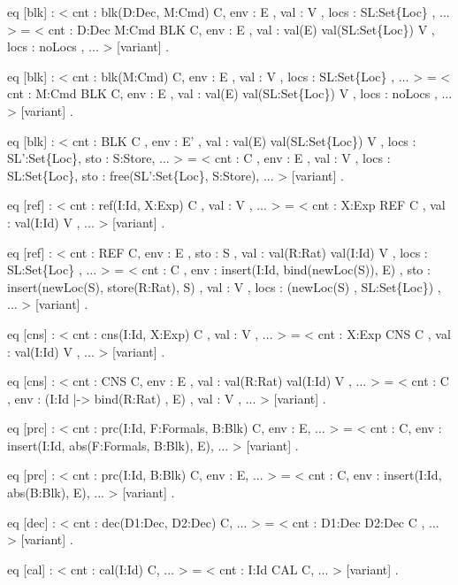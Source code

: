 \documentclass{llncs}%
\begin{document}
    eq [blk] :
        < cnt : blk(D:Dec, M:Cmd) C, env : E , val : V , locs : SL:Set\{Loc\} , ... > 
     =
        < cnt : D:Dec M:Cmd BLK C, env : E , 
                  val : val(E) val(SL:Set\{Loc\}) V , 
                  locs : noLocs , ... > [variant] .

    eq [blk] :
        < cnt : blk(M:Cmd) C, env : E , val : V , locs : SL:Set\{Loc\} , ... > 
     =
        < cnt : M:Cmd BLK C, env : E , 
                  val : val(E) val(SL:Set\{Loc\}) V , 
                  locs : noLocs , ... > [variant] .

    eq [blk] :
        < cnt : BLK C ,
          env : E' ,
          val : val(E) val(SL:Set\{Loc\}) V ,
         locs : SL':Set\{Loc\},
          sto : S:Store, ... > 
     =
        < cnt : C ,
          env : E ,
          val : V ,
         locs : SL:Set\{Loc\},
          sto : free(SL':Set\{Loc\}, S:Store), ... > [variant] .

    eq [ref] :
        < cnt : ref(I:Id, X:Exp) C , val : V , ... > =
        < cnt : X:Exp REF C , val : val(I:Id) V , ... > [variant] .

    eq [ref] :
        < cnt : REF C, env : E ,
          sto : S ,
          val : val(R:Rat) val(I:Id) V ,
          locs : SL:Set\{Loc\} , ... > 
     =
        < cnt : C ,
          env : insert(I:Id, bind(newLoc(S)), E) ,
          sto : insert(newLoc(S), store(R:Rat), S) ,
          val : V ,
          locs : (newLoc(S) , SL:Set\{Loc\}) , ... > [variant] .

    eq [cns] :
        < cnt : cns(I:Id, X:Exp) C , val : V , ... > =
        < cnt : X:Exp CNS C , val : val(I:Id) V , ... > [variant] .

    eq [cns] :
        < cnt : CNS C, env : E , val : val(R:Rat) val(I:Id) V , ... > =
        < cnt : C ,
          env : (I:Id |-> bind(R:Rat) , E) ,
          val : V , ... > [variant] .

    eq [prc] :
        < cnt : prc(I:Id, F:Formals, B:Blk) C, env : E, ... > =
        < cnt : C,
          env : insert(I:Id, abs(F:Formals, B:Blk), E), ... > [variant] .

    eq [prc] :
        < cnt : prc(I:Id, B:Blk) C, env : E, ... > =
        < cnt : C,
          env : insert(I:Id, abs(B:Blk), E), ... > [variant] .

    eq [dec] :
        < cnt : dec(D1:Dec, D2:Dec) C, ... > =
        < cnt : D1:Dec D2:Dec C , ... > [variant] .

    eq [cal] :
        < cnt : cal(I:Id) C, ... > =
        < cnt : I:Id CAL C, ... > [variant] .
\end{document}
